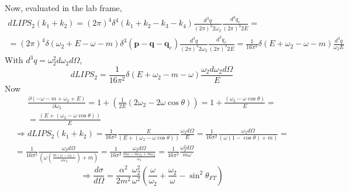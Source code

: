\documentclass[twoside]{amsart}
\begin{document}
Now, evaluated in the lab frame,
\[
\begin{gathered}
  dLIPS_2(k_1 + k_2) = (2\pi)^4 \delta^4(k_1 + k_2 -k_3 - k_4 ) \frac{ d^3 q }{ (2\pi)^3 2 \omega_2 } \frac{ d^3 q_e }{ (2\pi)^3 2 E } = \\ 
  = (2\pi)^4 \delta(\omega_2  + E - \omega - m ) \delta^3(\mathbf{p} - \mathbf{q} - \mathbf{q}_e ) \frac{ d^3q }{ (2\pi)^3 2 \omega_2 } \frac{ d^3q_e}{ (2\pi)^3 2 E } = \frac{1}{16 \pi^2 } \delta(E + \omega_2 - \omega - m ) \frac{ d^3q }{ \omega_2 E }
\end{gathered}
\]
With $d^3q = \omega_2^2 d\omega_2 d\Omega$, 
\[
dLIPS_2 = \frac{1}{16 \pi^2 } \delta( E + \omega_2 - m - \omega )  \frac{ \omega_2 d\omega_2 d\Omega }{ E } 
\]
Now
\[
\begin{gathered}
  \frac{ \partial ( -\omega - m + \omega_2 + E ) }{ \partial \omega_2  } = 1 + \left( \frac{1}{ 2 E } \left( 2 \omega_2 - 2 \omega \cos{\theta} \right) \right) = 1 + \frac{ ( \omega_2 - \omega \cos{\theta}  ) }{ E } = \\ 
   = \frac{  ( E + (\omega_2 - \omega \cos{\theta} )  ) }{ E } 
\end{gathered}
\]
\[
\begin{gathered}
  \Longrightarrow dLIPS_2(k_1 + k_2) = \frac{ 1 }{16 \pi^2 } \frac{ E}{ ( E + ( \omega_2 - \omega \cos{\theta} ) ) } \frac{ \omega_2 d\Omega }{ E } = \frac{ 1 }{ 16 \pi^2 } \frac{ \omega_2 d\Omega }{ ( \omega ( 1 - \cos{\theta} ) + m ) } = \\ 
  = \frac{1 }{ 16 \pi^2 } \frac{ \omega_2 d\Omega }{ \left( \omega \left( \frac{ m ( \omega - \omega_2  ) }{ \omega \omega_2 } \right) + m \right) } = \frac{ 1 }{ 16 \pi^2 } \frac{ \omega_2 d\Omega}{  \frac{ m \omega - m \omega_2 + m \omega_2 }{ \omega_2 } } = \frac{ 1 }{ 16 \pi^2 } \frac{ \omega_2^2 d\Omega }{ m \omega}
\end{gathered}
\]
\[
\Longrightarrow \boxed{ \frac{ d \sigma }{ d\Omega} = \frac{ \alpha^2}{2m^2 } \frac{ \omega_2^2 }{ \omega^2 }  \left( \frac{ \omega }{ \omega_2 } + \frac{ \omega_2}{ \omega } - \sin^2{\theta_{FT} } \right)}
\]


\end{document}
